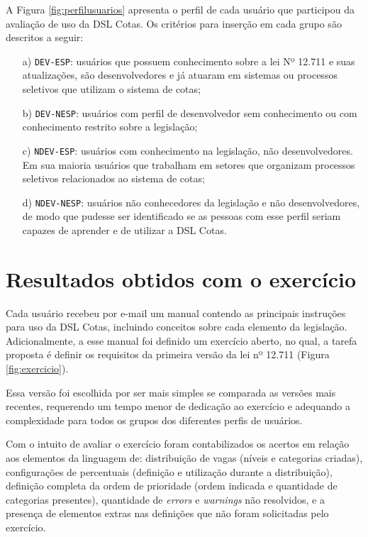 A Figura \ref{fig:perfilusuarios} apresenta o perfil de cada usuário que participou da avaliação de uso da DSL Cotas. Os critérios para inserção em cada grupo são descritos a seguir:

\begin{enumerate}
    \item[a)] \texttt{DEV-ESP}: usuários que possuem conhecimento sobre a lei Nº 12.711 e suas atualizações, são desenvolvedores e já atuaram em sistemas ou processos seletivos que utilizam o sistema de cotas;
    \item[b)] \texttt{DEV-NESP}: usuários com perfil de desenvolvedor sem conhecimento ou com conhecimento restrito sobre a legislação;
    \item[c)] \texttt{NDEV-ESP}: usuários com conhecimento na legislação, não desenvolvedores. Em sua maioria usuários que trabalham em setores que organizam processos seletivos relacionados ao sistema de cotas;
    \item[d)] \texttt{NDEV-NESP}: usuários não conhecedores da legislação e não desenvolvedores, de modo que pudesse ser identificado se as pessoas com esse perfil seriam capazes de aprender e de utilizar a DSL Cotas.
\end{enumerate}


\begin{landscape}

\end{landscape}

\section{Resultados obtidos com o exercício}
\label{sec:analiseexercicio}

Cada usuário recebeu por e-mail um manual  contendo as principais instruções para uso da DSL Cotas, incluindo conceitos sobre cada elemento da legislação. Adicionalmente, a esse manual foi definido um exercício aberto, no qual, a tarefa proposta é definir os requisitos da primeira versão da lei nº 12.711 (Figura \ref{fig:exercicio}). 



Essa versão foi escolhida por ser mais simples se comparada as versões mais recentes, requerendo um tempo menor de dedicação ao exercício e adequando a complexidade para todos os grupos dos diferentes perfis de usuários. 


Com o intuito de avaliar o exercício foram contabilizados os acertos em relação aos elementos da linguagem de: distribuição de vagas (níveis e categorias criadas), configurações de percentuais (definição e utilização durante a distribuição), definição completa da ordem de prioridade (ordem indicada e quantidade de categorias presentes), quantidade de \textit{errors} e \textit{warnings} não resolvidos, e a presença de elementos extras nas definições que não foram solicitadas pelo exercício.

